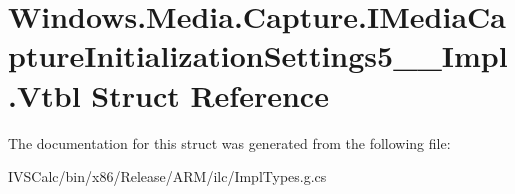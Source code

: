 \hypertarget{struct_windows_1_1_media_1_1_capture_1_1_i_media_capture_initialization_settings5_____impl_1_1_vtbl}{}\section{Windows.\+Media.\+Capture.\+I\+Media\+Capture\+Initialization\+Settings5\+\_\+\+\_\+\+Impl.\+Vtbl Struct Reference}
\label{struct_windows_1_1_media_1_1_capture_1_1_i_media_capture_initialization_settings5_____impl_1_1_vtbl}


The documentation for this struct was generated from the following file\+:\begin{DoxyCompactItemize}
\item 
I\+V\+S\+Calc/bin/x86/\+Release/\+A\+R\+M/ilc/Impl\+Types.\+g.\+cs\end{DoxyCompactItemize}
